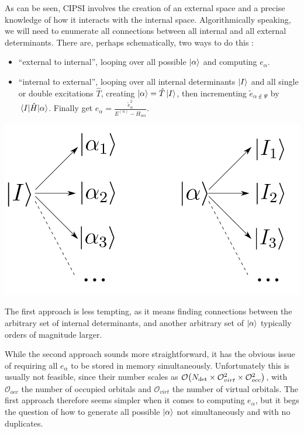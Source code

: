 \documentclass[./thesis.tex]{subfiles}
\begin{document}
As can be seen, CIPSI involves the creation of an external space and a precise knowledge of how it interacts with the internal space. Algorithmically speaking, we will need to enumerate all connections between all internal and all external determinants.
There are, perhaps schematically, two ways to do this :

\begin{itemize}
\item
``external to internal'', looping over all possible ${\ket{\alpha}}$ and computing $e_\alpha$.
\item
``internal to external'', looping over all internal determinants $\ket I$ and all single or double excitations $\hat T$, creating ${\ket{\alpha}} = \hat T \ket I$, then incrementing $\tilde e_{\alpha \notin \Psi}$ by $\mel{I}{\hat{H}}{\alpha}$. Finally get $e_{\alpha} = \frac{\tilde e_\alpha^2}{E^{(n)} - H_{\alpha \alpha}}$.
\end{itemize}

	\begin{center}
		\includegraphics[width=0.5\columnwidth]{figures/matrix_dressing/interactions}
	\end{center}

The first approach is less tempting, as it means finding connections between the arbitrary set of internal determinants, and another arbitrary set of ${\ket{\alpha}}$ typically orders of magnitude larger.

While the second approach sounds more straightforward, it has the obvious issue of requiring all $e_\alpha$ to be stored in memory simultaneously. Unfortunately this is usually not feasible, since their number scales as $\order{\Ndet \times \mathcal{O}_{virt}^2 \times \mathcal{O}_{occ}^2}$, with $\mathcal{O}_{occ}$ the number of occupied orbitals and $\mathcal{O}_{virt}$ the number of virtual orbitals.
The first approach therefore seems simpler when it comes to computing $e_\alpha$, but it begs the question of how to generate all possible ${\ket{\alpha}}$ not simultaneously and with no duplicates. 
\end{document}
